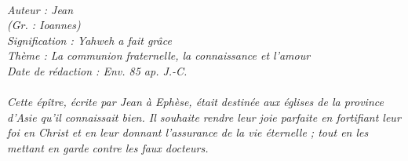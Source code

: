 \BFont
\noindent\hrulefill
{\footnotesize
\textit{
\bigskip
{\centering{}
\\Auteur : Jean
\\(Gr. : Ioannes)
\\Signification : Yahweh a fait grâce
\\Thème : La communion fraternelle, la connaissance et l'amour
\\Date de rédaction : Env. 85 ap. J.-C.\\}
}
\textit{
\\Cette épître, écrite par Jean à Ephèse, était destinée aux églises de la province d'Asie qu'il connaissait bien. Il souhaite rendre leur joie parfaite en fortifiant leur foi en Christ et en leur donnant l'assurance de la vie éternelle ; tout en les mettant en garde contre les faux docteurs.\bigskip
}
}
\par\nobreak\noindent\hrulefill
